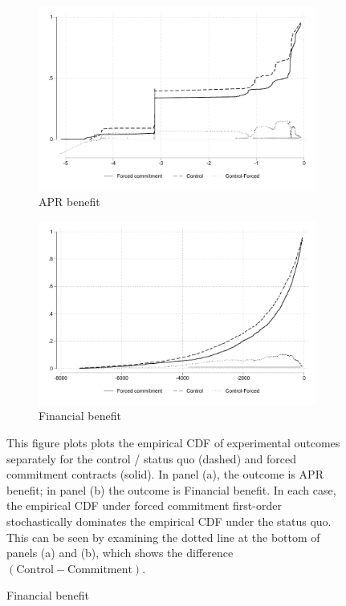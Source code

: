 \begin{figure}[H]
    \begin{center}
       \begin{subfigure}{0.49\textwidth}
        \caption{APR benefit}
        \centering
        \includegraphics[width=\textwidth]{Figuras/cdf_apr.pdf}
    \end{subfigure} 
   \begin{subfigure}{0.49\textwidth}
        \caption{Financial benefit}
        \centering
        \includegraphics[width=\textwidth]{Figuras/cdf_fc_admin.pdf}
    \end{subfigure} 
    \end{center}
    \scriptsize This figure plots plots the empirical CDF of experimental outcomes separately for the control / status quo (dashed) and forced commitment contracts (solid). In panel (a), the outcome is APR benefit; in panel (b) the outcome is Financial benefit. In each case, the empirical CDF under forced commitment first-order stochastically dominates the empirical CDF under the status quo. This can be seen by examining the dotted line at the bottom of panels (a) and (b), which shows the difference $(\text{Control} - \text{Commitment})$. 

\end{figure}
